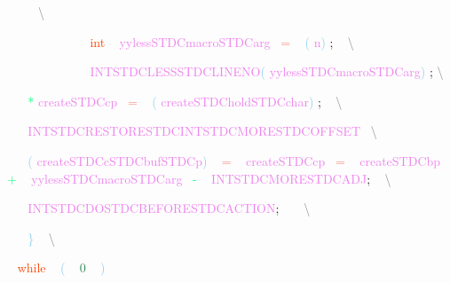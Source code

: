 \documentclass[8, usernames, dvipsnames]{beamer}
\begin{document}
\begin{frame}
\textcolor{White}{\   }
\textcolor{White}{\   }
\textcolor{White}{\ }
\textcolor{Gray}{\textbackslash }

 \textcolor{White}{\ }
\textcolor{White}{\ }
\textcolor{White}{\ }
\textcolor{White}{\ }
\textcolor{White}{\ }
\textcolor{White}{\ }
\textcolor{White}{\ }
\textcolor{White}{\ }
\textcolor{OrangeRed}{int}
\textcolor{White}{\ }
\textcolor{Violet}{yylessSTDCmacroSTDCarg}\textcolor{White}{\ }
\textcolor{Salmon}{=}
\textcolor{White}{\ }
\textcolor{SkyBlue}{(}
\textcolor{Violet}{n}\textcolor{SkyBlue}{)}
\textcolor{Sepia}{;}
\textcolor{White}{\ }
\textcolor{Gray}{\textbackslash }

 \textcolor{White}{\ }
\textcolor{White}{\ }
\textcolor{White}{\ }
\textcolor{White}{\ }
\textcolor{White}{\ }
\textcolor{White}{\ }
\textcolor{White}{\ }
\textcolor{White}{\ }
\textcolor{Violet}{INTSTDCLESSSTDCLINENO}\textcolor{SkyBlue}{(}
\textcolor{Violet}{yylessSTDCmacroSTDCarg}\textcolor{SkyBlue}{)}
\textcolor{Sepia}{;}
\textcolor{Gray}{\textbackslash }

 \textcolor{White}{\   }
\textcolor{White}{\   }
\textcolor{SpringGreen}{*}
\textcolor{Violet}{createSTDCcp}\textcolor{White}{\ }
\textcolor{Salmon}{=}
\textcolor{White}{\ }
\textcolor{SkyBlue}{(}
\textcolor{Violet}{createSTDCholdSTDCchar}\textcolor{SkyBlue}{)}
\textcolor{Sepia}{;}
\textcolor{White}{\ }
\textcolor{Gray}{\textbackslash }

 \textcolor{White}{\   }
\textcolor{White}{\   }
\textcolor{Violet}{INTSTDCRESTORESTDCINTSTDCMORESTDCOFFSET}\textcolor{White}{\ }
\textcolor{Gray}{\textbackslash }

 \textcolor{White}{\   }
\textcolor{White}{\   }
\textcolor{SkyBlue}{(}
\textcolor{Violet}{createSTDCcSTDCbufSTDCp}\textcolor{SkyBlue}{)}
\textcolor{White}{\ }
\textcolor{Salmon}{=}
\textcolor{White}{\ }
\textcolor{Violet}{createSTDCcp}\textcolor{White}{\ }
\textcolor{Salmon}{=}
\textcolor{White}{\ }
\textcolor{Violet}{createSTDCbp}\textcolor{White}{\ }
\textcolor{SpringGreen}{+}
\textcolor{White}{\ }
\textcolor{Violet}{yylessSTDCmacroSTDCarg}\textcolor{White}{\ }
\textcolor{SpringGreen}{-}
\textcolor{White}{\ }
\textcolor{Violet}{INTSTDCMORESTDCADJ}\textcolor{Sepia}{;}
\textcolor{White}{\ }
\textcolor{Gray}{\textbackslash }

 \textcolor{White}{\   }
\textcolor{White}{\   }
\textcolor{Violet}{INTSTDCDOSTDCBEFORESTDCACTION}\textcolor{Sepia}{;}
\textcolor{White}{\ }
\textcolor{White}{\ }
\textcolor{Gray}{\textbackslash }

 \textcolor{White}{\   }
\textcolor{White}{\   }
\textcolor{SkyBlue}{\} }
\textcolor{White}{\ }
\textcolor{Gray}{\textbackslash }

 \textcolor{White}{\   }
\textcolor{OrangeRed}{while}
\textcolor{White}{\ }
\textcolor{SkyBlue}{(}
\textcolor{White}{\ }
\textcolor{SeaGreen}{0}
\textcolor{White}{\ }
\textcolor{SkyBlue}{)}

 
 \end{frame}
\end{document}
